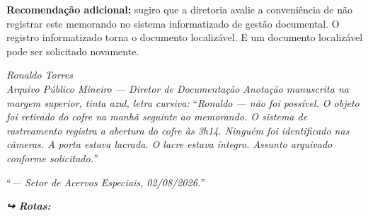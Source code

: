 \noindent \textbf{Recomendação adicional:} sugiro que a diretoria avalie a conveniência de não registrar este memorando no sistema informatizado de gestão documental. O registro informatizado torna o documento localizável. E um documento localizável pode ser solicitado novamente.

\noindent \textit{Ronaldo Torres}\\
\noindent \textit{Arquivo Público Mineiro --- Diretor de Documentação}
\noindent \textit{Anotação manuscrita na margem superior, tinta azul, letra cursiva:}
\noindent \textquotedblleft{}\textit{Ronaldo --- não foi possível. O objeto foi retirado do cofre na manhã seguinte ao memorando. O sistema de rastreamento registra a abertura do cofre às 3h14. Ninguém foi identificado nas câmeras. A porta estava lacrada. O lacre estava íntegro. Assunto arquivado conforme solicitado.\textquotedblright{}}

\noindent \textquotedblleft{}\textit{--- Setor de Acervos Especiais, 02/08/2026.\textquotedblright{}}

\vspace{0.5em}
\noindent\textit{\textbf{↪ Rotas:}  \rotasep {} \rotasep {}}